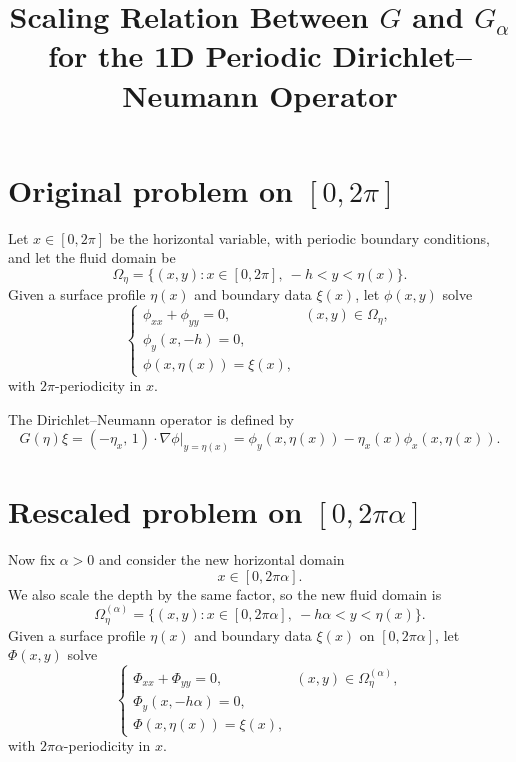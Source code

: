 \documentclass[11pt]{article}
\title{Scaling Relation Between $G$ and $G_\alpha$ for the 1D Periodic Dirichlet--Neumann Operator}
\author{}
\date{}
\begin{document}
\maketitle

\section{Original problem on $[0,2\pi]$}

Let $x \in [0,2\pi]$ be the horizontal variable, with periodic boundary conditions, and let the fluid domain be
\[
\Omega_\eta
=
\{(x,y): x \in [0,2\pi],\ -h < y < \eta(x)\}.
\]
Given a surface profile $\eta(x)$ and boundary data $\xi(x)$, let $\phi(x,y)$ solve
\begin{equation}
\begin{cases}
\phi_{xx} + \phi_{yy} = 0, & (x,y) \in \Omega_\eta,\\[0.3em]
\phi_y(x,-h)=0,\\[0.3em]
\phi(x,\eta(x))=\xi(x),
\end{cases}
\label{eq:orig_bvp}
\end{equation}
with $2\pi$-periodicity in $x$.

The Dirichlet--Neumann operator is defined by
\begin{equation}
G(\eta)\xi
=
\left( -\eta_x,\, 1 \right)\cdot \nabla \phi \Big|_{y=\eta(x)}
=
\phi_y(x,\eta(x))-\eta_x(x)\phi_x(x,\eta(x)).
\label{eq:G_def}
\end{equation}

\section{Rescaled problem on $[0,2\pi\alpha]$}

Now fix $\alpha>0$ and consider the new horizontal domain
\[
x \in [0,2\pi\alpha].
\]
We also scale the depth by the same factor, so the new fluid domain is
\[
\Omega^{(\alpha)}_\eta
=
\{(x,y): x \in [0,2\pi\alpha],\ -h\alpha < y < \eta(x)\}.
\]
Given a surface profile $\eta(x)$ and boundary data $\xi(x)$ on $[0,2\pi\alpha]$, let $\Phi(x,y)$ solve
\begin{equation}
\begin{cases}
\Phi_{xx} + \Phi_{yy} = 0, & (x,y) \in \Omega^{(\alpha)}_\eta,\\[0.3em]
\Phi_y(x,-h\alpha)=0,\\[0.3em]
\Phi(x,\eta(x))=\xi(x),
\end{cases}
\label{eq:alpha_bvp}
\end{equation}
with $2\pi\alpha$-periodicity in $x$.
\end{document}

